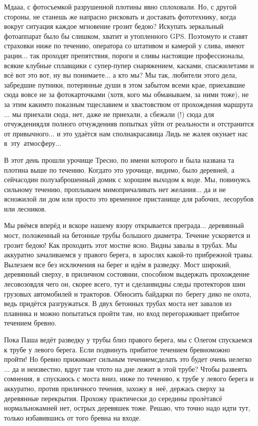 Мда\sdash а\sdash а, с фотосъемкой разрушенной плотины явно сплоховали. Но, с другой стороны, не станешь же напрасно рисковать и доставать фототехнику, когда вокруг ситуация каждое мгновение грозит бедою? Искупать зеркальный фотоаппарат было бы слишком, хватит и утопленного GPS. Поэтому\sdash то и ставят страховки ниже по течению, оператора со штативом и камерой у слива, имеют рации$\ldots$ так проходят препятствия, пороги и сливы настоящие профессионалы, всякие клубные сплавщики с супер-пупер снаряжением, касками, спасжилетами и всё вот это вот, ну вы понимаете$\ldots$ а кто мы? Мы так, любители этого дела, забредшие путники, потерянные души в этом забытом всеми крае, приехавшие сюда вовсе не за фотокарточками (хотя, кого мы обманываем, за ними тоже), не за этим каким\sdash то показным тщеславием и хвастовством от прохождения маршрута$\ldots$ мы приехали сюда, нет, даже не приехали, а сбежали (!) сюда для отчуждения\mdash для полного отчуждения\mdash в попытках уйти от реальности и отстранится от привычного$\ldots$ и это удаётся нам сполна\mdash красавица Лидь не жалея окунает нас в~эту~атмосферу$\ldots$

В этот день прошли урочище Тресно, по имени которого и была названа та плотина выше по течению. Когда\sdash то это урочище, видимо, было деревней, а сейчас\mdash один полузаброшенный домик с хорошим выходом к воде. Мы, повинуясь сильному течению, проплываем мимо\mdash причаливать нет желания$\ldots$ да и не ясно\mdash жилой ли дом или просто это временное пристанище для рабочих, лесорубов или лесников.

Мы рвёмся вперёд и вскоре нашему взору открывается преграда$\ldots$ деревянный мост, положенный на бетонные трубы большого диаметра. Течение ускоряется и грозит бедою! Как проходить этот мост\mdash не ясно. Видны завалы в трубах. Мы аккуратно зачаливаемся у правого берега, в зарослях какой-то прибрежной травы. Вылезаем все без исключения на берег и идём в разведку. Мост широкий, деревянный сверху, в приличном состоянии, способном выдержать прохождение лесовозов\mdash для чего он, скорее всего, тут и сделан\mdash видны следы протекторов шин грузовых автомобилей и тракторов. Обносить байдарки по~берегу дико не охота, ведь придётся разгружаться. В двух бетонных трубах моста нет завалов из плавника и можно попытаться пройти там, но вход перегораживает прибитое течением бревно. 

Пока Паша ведёт разведку у трубы близ правого берега, мы с Олегом спускаемся к трубе у левого берега. Если подвинуть прибитое течением бревно\mdash можно пройти! Но бревно прижимает сильным течением\mdash сделать это будет очень нелегко$\ldots$ да и неизвестно, вдруг там что\sdash то на дне лежит в этой трубе? Чтобы развеять сомнения, я~спускаюсь с моста вниз, ниже по течению, к трубе у левого берега и аккуратно, против приличного течения, захожу в~неё, держась сверху за деревянные перекрытия. Прохожу практически до середины пролёта\mdash всё нормально\mdash камней нет, острых деревяшек тоже. Решаю, что точно надо идти тут, только избавившись от того бревна на входе.

